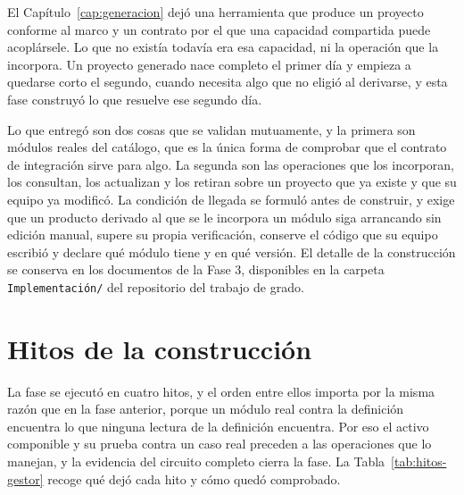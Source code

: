 \label{cap:gestor}

El Capítulo~\ref{cap:generacion} dejó una herramienta que produce un proyecto
conforme al marco y un contrato por el que una capacidad compartida puede
acoplársele. Lo que no existía todavía era esa capacidad, ni la operación que
la incorpora. Un proyecto generado nace completo el primer día y empieza a
quedarse corto el segundo, cuando necesita algo que no eligió al derivarse, y
esta fase construyó lo que resuelve ese segundo día.

Lo que entregó son dos cosas que se validan mutuamente, y la primera son
módulos reales del catálogo, que es la única forma de comprobar que el
contrato de integración sirve para algo. La segunda son las operaciones que
los incorporan, los consultan, los actualizan y los retiran sobre un proyecto
que ya existe y que su equipo ya modificó. La condición de llegada se formuló
antes de construir, y exige que un producto derivado al que se le incorpora un
módulo siga arrancando sin edición manual, supere su propia verificación,
conserve el código que su equipo escribió y declare qué módulo tiene y en qué
versión. El detalle de la construcción se conserva en los documentos de la
Fase 3, disponibles en la carpeta \texttt{Implementación/} del repositorio del
trabajo de grado.

\section{Hitos de la construcción}
\label{sec:hitos-fase-3}

La fase se ejecutó en cuatro hitos, y el orden entre ellos importa por la
misma razón que en la fase anterior, porque un módulo real contra la
definición encuentra lo que ninguna lectura de la definición encuentra. Por
eso el activo componible y su prueba contra un caso real preceden a las
operaciones que lo manejan, y la evidencia del circuito completo cierra la
fase. La Tabla~\ref{tab:hitos-gestor} recoge qué dejó cada hito y cómo quedó
comprobado.

